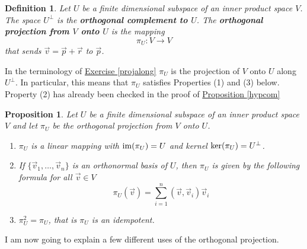 \documentclass[11pt]{amsbook}
\newtheorem{definition}[theorem]{Definition}
\newtheorem{proposition}[theorem]{Proposition}
\theoremstyle{definition}
\begin{document}
\begin{definition}\label{orthproj}
Let $U$ be a finite dimensional subspace of an inner product space $V$. The space $U^{\perp}$ is the {\bf orthogonal complement to $U$}. The {\bf orthogonal projection from $V$ onto $U$} is the mapping $$\pi_U : V \to V$$ that sends $\vec{v} = \vec{p} + \vec{r}$ to $\vec{p}$. \end{definition}
In the terminology of \hyperref[projalong]{Exercise \ref{projalong}} $\pi_U$ is the projection of $V$ onto $U$ along $U^{\perp}$. In particular, this means that $\pi_U$ satisfies Properties (1) and (3) below. Property (2) has already been checked in the proof of \hyperref[hypcom]{Proposition \ref{hypcom}}
\begin{proposition} \label{orthogproj} Let $U$ be a finite dimensional subspace of an inner product space $V$ and let $\pi_U$ be the orthogonal projection from $V$ onto $U$.
\begin{enumerate}
\item $\pi_U$ is a linear mapping with ${\rm im} (\pi_U) = U$ and kernel ${\rm ker}(\pi_U) = U^{\perp}$.
\item If $\{ \vec{v}_1, \ldots , \vec{v}_n\}$ is an orthonormal basis of $U$, then $\pi_U$ is given by the following formula for all $\vec{v}\in V$ $$\pi_U(\vec{v}) =  \sum_{i=1}^n  (\vec{v}, \vec{v}_i) \vec{v}_i$$
\item $\pi_U^2 = \pi_U$, that is $\pi_U$ is an idempotent.
\end{enumerate}
\end{proposition}

I am now going to explain a few different uses of the orthogonal projection.
\end{document}
